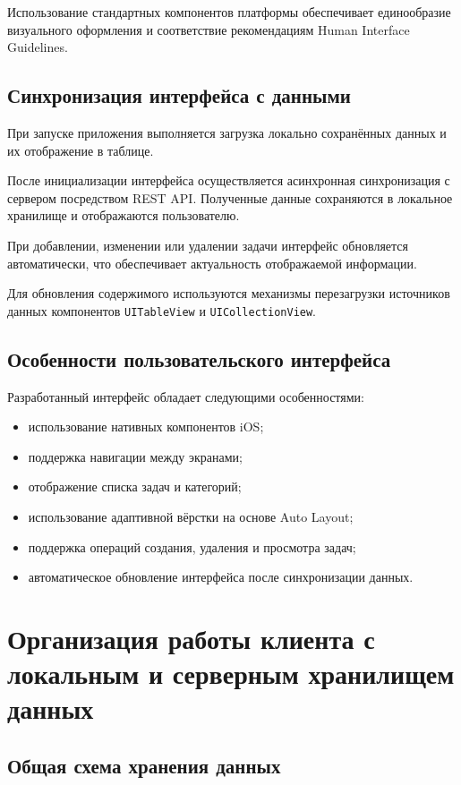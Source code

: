 \documentclass[14pt,a4paper]{extarticle}
\begin{document}
Использование стандартных компонентов платформы обеспечивает единообразие визуального оформления и соответствие рекомендациям Human Interface Guidelines.

\subsection{Синхронизация интерфейса с данными}

При запуске приложения выполняется загрузка локально сохранённых данных и их отображение в таблице.

После инициализации интерфейса осуществляется асинхронная синхронизация с сервером посредством REST API. Полученные данные сохраняются в локальное хранилище и отображаются пользователю.

При добавлении, изменении или удалении задачи интерфейс обновляется автоматически, что обеспечивает актуальность отображаемой информации.

Для обновления содержимого используются механизмы перезагрузки источников данных компонентов \texttt{UITableView} и \texttt{UICollectionView}.

\subsection{Особенности пользовательского интерфейса}

Разработанный интерфейс обладает следующими особенностями:

\begin{itemize}
    \item использование нативных компонентов iOS;
    \item поддержка навигации между экранами;
    \item отображение списка задач и категорий;
    \item использование адаптивной вёрстки на основе Auto Layout;
    \item поддержка операций создания, удаления и просмотра задач;
    \item автоматическое обновление интерфейса после синхронизации данных.
\end{itemize}

\newpage
\section{Организация работы клиента с локальным и серверным хранилищем данных}

\subsection{Общая схема хранения данных}
\end{document}
